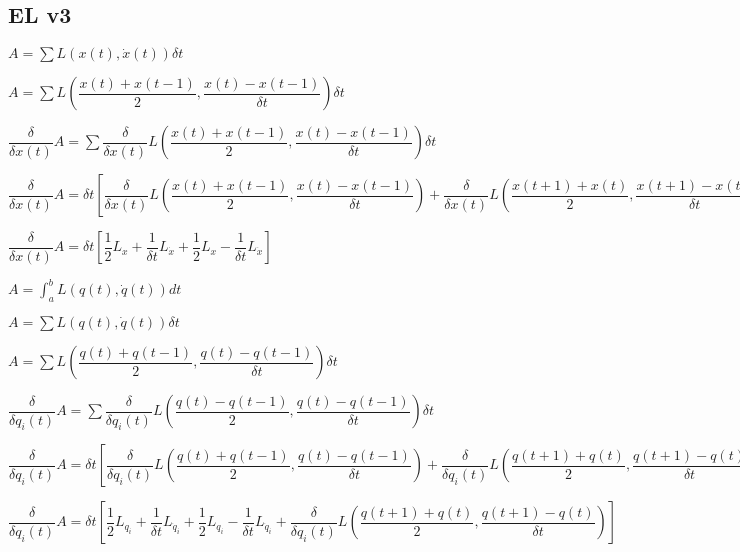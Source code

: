 \subsection{EL v3}


\(A=\sum L(x(t), \dot x(t)) \delta t \)

\(A=\sum L(\dfrac{x(t)+x(t-1)}{2}, \dfrac{x(t)-x(t-1)}{\delta t}) \delta t \)

 

\(\dfrac{\delta }{\delta x(t)}A = \sum \dfrac{\delta }{\delta x(t)}L(\dfrac{x(t)+x(t-1)}{2}, \dfrac{x(t)-x(t-1)}{\delta t}) \delta t \)

 

\(\dfrac{\delta }{\delta x(t)}A = \delta t [\dfrac{\delta }{\delta x(t)}L(\dfrac{x(t)+x(t-1)}{2}, \dfrac{x(t)-x(t-1)}{\delta t}) + \dfrac{\delta }{\delta x(t)}L(\dfrac{x(t+1)+x(t)}{2}, \dfrac{x(t+1)-x(t)}{\delta t})]\)

 

\(\dfrac{\delta }{\delta x(t)}A = \delta t [\dfrac{1}{2}L_x +\dfrac{1}{\delta t}L_{\dot x} + \dfrac{1}{2}L_x -\dfrac{1}{\delta t}L_{\dot x}]\)

 

\(A=\int_a^b L(q(t), \dot q(t)) dt\)

\(A=\sum L(q(t), \dot q(t)) \delta t\)

\(A=\sum L(\dfrac{q(t)+q(t-1)}{2}, \dfrac{q(t)-q(t-1)}{\delta t}) \delta t\)

\(\dfrac{\delta }{\delta q_i(t)}A = \sum \dfrac{\delta }{\delta q_i(t)}L(\dfrac{q(t)-q(t-1)}{2}, \dfrac{q(t)-q(t-1)}{\delta t}) \delta t\)

\(\dfrac{\delta }{\delta q_i(t)}A = \delta t [\dfrac{\delta }{\delta q_i(t)}L(\dfrac{q(t)+q(t-1)}{2}, \dfrac{q(t)-q(t-1)}{\delta t})+\dfrac{\delta }{\delta q_i(t)}L(\dfrac{q(t+1)+q(t)}{2}, \dfrac{q(t+1)-q(t)}{\delta t})]\)

 

\(\dfrac{\delta }{\delta q_i(t)}A = \delta t [\dfrac{1}{2}L_{q_i}+\dfrac{1}{\delta t}L_{\dot q_i}+\dfrac{1}{2}L_{q_i}-\dfrac{1}{\delta t}L_{\dot q_i}+\dfrac{\delta }{\delta q_i(t)}L(\dfrac{q(t+1)+q(t)}{2}, \dfrac{q(t+1)-q(t)}{\delta t})]\)

